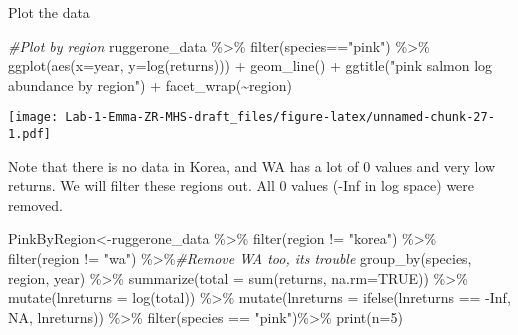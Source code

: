 \documentclass[
]{article}
\newenvironment{Shaded}{\begin{snugshade}}{\end{snugshade}}
\newcommand{\AttributeTok}[1]{\textcolor[rgb]{0.77,0.63,0.00}{#1}}
\newcommand{\CommentTok}[1]{\textcolor[rgb]{0.56,0.35,0.01}{\textit{#1}}}
\newcommand{\ConstantTok}[1]{\textcolor[rgb]{0.00,0.00,0.00}{#1}}
\newcommand{\DecValTok}[1]{\textcolor[rgb]{0.00,0.00,0.81}{#1}}
\newcommand{\FunctionTok}[1]{\textcolor[rgb]{0.00,0.00,0.00}{#1}}
\newcommand{\NormalTok}[1]{#1}
\newcommand{\OtherTok}[1]{\textcolor[rgb]{0.56,0.35,0.01}{#1}}
\newcommand{\SpecialCharTok}[1]{\textcolor[rgb]{0.00,0.00,0.00}{#1}}
\newcommand{\StringTok}[1]{\textcolor[rgb]{0.31,0.60,0.02}{#1}}
\begin{document}
Plot the data

\begin{Shaded}
\begin{Highlighting}[]
\CommentTok{\#Plot by region}
\NormalTok{ruggerone\_data }\SpecialCharTok{\%\textgreater{}\%} 
  \FunctionTok{filter}\NormalTok{(species}\SpecialCharTok{==}\StringTok{"pink"}\NormalTok{) }\SpecialCharTok{\%\textgreater{}\%} 
  \FunctionTok{ggplot}\NormalTok{(}\FunctionTok{aes}\NormalTok{(}\AttributeTok{x=}\NormalTok{year, }\AttributeTok{y=}\FunctionTok{log}\NormalTok{(returns))) }\SpecialCharTok{+} 
  \FunctionTok{geom\_line}\NormalTok{() }\SpecialCharTok{+} 
  \FunctionTok{ggtitle}\NormalTok{(}\StringTok{"pink salmon log abundance by region"}\NormalTok{) }\SpecialCharTok{+}
  \FunctionTok{facet\_wrap}\NormalTok{(}\SpecialCharTok{\textasciitilde{}}\NormalTok{region)}
\end{Highlighting}
\end{Shaded}

\texttt{[image: Lab-1-Emma-ZR-MHS-draft\_files/figure-latex/unnamed-chunk-27-1.pdf]}

Note that there is no data in Korea, and WA has a lot of 0 values and
very low returns. We will filter these regions out. All 0 values (-Inf
in log space) were removed.

\begin{Shaded}
\begin{Highlighting}[]
\NormalTok{PinkByRegion}\OtherTok{\textless{}{-}}\NormalTok{ruggerone\_data }\SpecialCharTok{\%\textgreater{}\%}
  \FunctionTok{filter}\NormalTok{(region }\SpecialCharTok{!=} \StringTok{"korea"}\NormalTok{) }\SpecialCharTok{\%\textgreater{}\%} 
  \FunctionTok{filter}\NormalTok{(region }\SpecialCharTok{!=} \StringTok{"wa"}\NormalTok{) }\SpecialCharTok{\%\textgreater{}\%}\CommentTok{\#Remove WA too, it\textquotesingle{}s trouble }
  \FunctionTok{group\_by}\NormalTok{(species, region, year) }\SpecialCharTok{\%\textgreater{}\%}
  \FunctionTok{summarize}\NormalTok{(}\AttributeTok{total =} \FunctionTok{sum}\NormalTok{(returns, }\AttributeTok{na.rm=}\ConstantTok{TRUE}\NormalTok{)) }\SpecialCharTok{\%\textgreater{}\%} 
  \FunctionTok{mutate}\NormalTok{(}\AttributeTok{lnreturns =} \FunctionTok{log}\NormalTok{(total)) }\SpecialCharTok{\%\textgreater{}\%}
  \FunctionTok{mutate}\NormalTok{(}\AttributeTok{lnreturns =} \FunctionTok{ifelse}\NormalTok{(lnreturns }\SpecialCharTok{==} \SpecialCharTok{{-}}\ConstantTok{Inf}\NormalTok{, }\ConstantTok{NA}\NormalTok{, lnreturns)) }\SpecialCharTok{\%\textgreater{}\%}
  \FunctionTok{filter}\NormalTok{(species }\SpecialCharTok{==} \StringTok{"pink"}\NormalTok{)}\SpecialCharTok{\%\textgreater{}\%} 
  \FunctionTok{print}\NormalTok{(}\AttributeTok{n=}\DecValTok{5}\NormalTok{)}
\end{Highlighting}
\end{Shaded}
\end{document}
